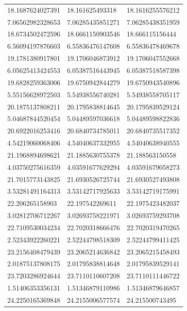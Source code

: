 \documentclass[10pt,a4paper]{article}
\begin{document}
\begin{center}
\begin{longtable}{ |p{2.8cm}|p{2.8cm}|p{2.8cm}| }
    18.1687624027391  & 18.161625493318   & 18.1616255576212    \\
    7.06562982328653  & 7.06285435851271  & 7.06285438351959    \\
    18.6734502472596  & 18.6661150903546  & 18.666115156444     \\
    6.56094197876603  & 6.55836476147608  & 6.55836478469678    \\
    19.1781380917801  & 19.1706046873912  & 19.1706047552668    \\
    6.05625413424553  & 6.05387516443945  & 6.05387518587398    \\
    19.6828259363006  & 19.6750942844279  & 19.6750943540896    \\
    5.55156628972503  & 5.54938556740281  & 5.54938558705117    \\
    20.1875137808211  & 20.1795838814645  & 20.1795839529124    \\
    5.04687844520454  & 5.04489597036618  & 5.04489598822836    \\
    20.6922016253416  & 20.6840734785011  & 20.6840735517352    \\
    4.54219060068406  & 4.54040637332955  & 4.54040638940555    \\
    21.1968894698621  & 21.1885630755378  & 21.188563150558     \\
    4.03750275616359  & 4.03591677629294  & 4.03591679058273    \\
    21.7015773143825  & 21.6930526725744  & 21.6930527493808    \\
    3.53281491164313  & 3.53142717925633  & 3.53142719175991    \\
    22.206265158903   & 22.197542269611   & 22.1975423482037    \\
    3.02812706712267  & 3.02693758221971  & 3.02693759293708    \\
    22.7109530034234  & 22.7020318666476  & 22.7020319470265    \\
    2.52343922260221  & 2.52244798518309  & 2.52244799411425    \\
    23.2156408479439  & 23.2065214636842  & 23.2065215458493    \\
    2.01875137808175  & 2.01795838814648  & 2.01795839529141    \\
    23.7203286924644  & 23.7110110607208  & 23.7110111446722    \\
    1.51406353356131  & 1.51346879110986  & 1.51346879646857    \\
    24.2250165369848  & 24.2155006577574  & 24.215500743495     \\

\end{longtable}
\end{center}
\end{document}
